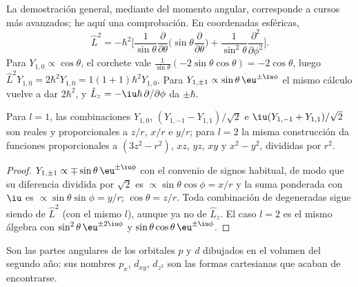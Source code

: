 La demostración general, mediante  del momento angular, corresponde a
cursos más avanzados; he aquí una comprobación. En coordenadas esféricas,
\[
\hat L^2 = -\hbar^2\Big[\frac{1}{\sin\theta}\frac{\partial}{\partial\theta}
\Big(\sin\theta\frac{\partial}{\partial\theta}\Big) +
\frac{1}{\sin^2\theta}\frac{\partial^2}{\partial\phi^2}\Big].
\]
Para $Y_{1,0} \propto \cos\theta$, el corchete vale $\frac{1}{\sin\theta}(-2\sin\theta
\cos\theta) = -2\cos\theta$, luego $\hat L^2Y_{1,0} = 2\hbar^2Y_{1,0} = 1(1+1)\hbar^2
Y_{1,0}$. Para $Y_{1,\pm1} \propto \sin\theta\,\eu^{\pm\iu\phi}$ el mismo
cálculo vuelve a dar $2\hbar^2$, y $\hat L_z = -\iu\hbar\,\partial/\partial
\phi$ da $\pm\hbar$.

\begin{proposition}\label{prop:b3:quantum-model-systems:real-harmonics}
Para $l = 1$, las combinaciones $Y_{1,0}$, $(Y_{1,-1} - Y_{1,1})/\sqrt2$ e
$\iu(Y_{1,-1} + Y_{1,1})/\sqrt2$ son reales y proporcionales a $z/r$, $x/r$ e
$y/r$; para $l = 2$ la misma construcción da funciones proporcionales a
$(3z^2 - r^2)$, $xz$, $yz$, $xy$ y $x^2 - y^2$, divididas por $r^2$.
\end{proposition}

\begin{proof}
$Y_{1,\pm1} \propto \mp\sin\theta\,\eu^{\pm\iu\phi}$ con el convenio de signos
habitual, de modo que su diferencia dividida por $\sqrt2$ es $\propto\sin\theta\cos\phi =
x/r$ y la suma ponderada con $\iu$ es $\propto\sin\theta\sin\phi = y/r$;
$\cos\theta = z/r$. Toda combinación de  degeneradas sigue siendo
 de $\hat L^2$ (con el mismo $l$), aunque ya no de $\hat
L_z$. El caso $l = 2$ es el mismo álgebra con $\sin^2\theta\,\eu^{\pm2\iu\phi}$
y $\sin\theta\cos\theta\,\eu^{\pm\iu\phi}$.
\end{proof}

Son las partes angulares de los orbitales $p$ y $d$ dibujados en el volumen del segundo
año: sus nombres $p_x$, $d_{xy}$, $d_{z^2}$ son las formas cartesianas que acaban de
encontrarse.

